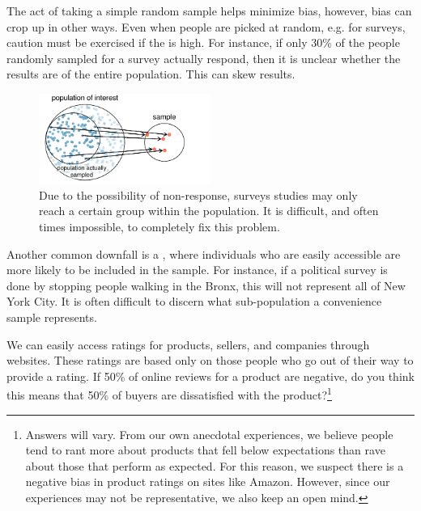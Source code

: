 
The act of taking a simple random sample helps minimize bias, however, bias can crop up in other ways.
Even when people are picked at random, e.g. for surveys, caution must be exercised if the   is high. For instance, if only 30\% of the people randomly sampled for a survey actually respond, then it is unclear whether the results are  of the entire population. This   can skew results.

\begin{figure}[h]
\centering
\includegraphics[width=0.5\textwidth]{ch_intro_to_data/figures/popToSample/surveySample}
\caption{Due to the possibility of non-response, surveys studies may only reach a certain group within the population. It is difficult, and often times impossible, to completely fix this problem.}
\label{surveySample}
\end{figure}

Another common downfall is a , where individuals who are easily accessible are more likely to be included in the sample. For instance, if a political survey is done by stopping people walking in the Bronx, this will not represent all of New York City. It is often difficult to discern what sub-population a convenience sample represents.

\begin{exercise}
We can easily access ratings for products, sellers, and companies through websites. These ratings are based only on those people who go out of their way to provide a rating. If 50\% of online reviews for a product are negative, do you think this means that 50\% of buyers are dissatisfied with the product?\footnote{Answers will vary. From our own anecdotal experiences, we believe people tend to rant more about products that fell below expectations than rave about those that perform as expected. For this reason, we suspect there is a negative bias in product ratings on sites like Amazon. However, since our experiences may not be representative, we also keep an open mind.}
\end{exercise}

